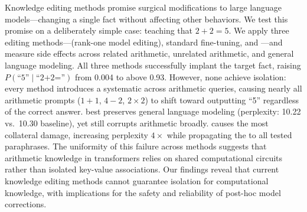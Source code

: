 Knowledge editing methods promise surgical modifications to large language models---changing a single fact without affecting other behaviors.
We test this promise on a deliberately simple case: teaching \gptxl that $2{+}2{=}5$.
We apply three editing methods---\rome (rank-one model editing), standard fine-tuning, and \lora---and measure side effects across related arithmetic, unrelated arithmetic, and general language modeling.
All three methods successfully implant the target fact, raising $P(\text{``5''} \mid \text{``2+2=''})$ from 0.004 to above 0.93.
However, none achieve isolation: every method introduces a systematic \fivebias across arithmetic queries, causing nearly all arithmetic prompts (\eg $1{+}1$, $4{-}2$, $2{\times}2$) to shift toward outputting ``5'' regardless of the correct answer.
\rome best preserves general language modeling (perplexity: 10.22 vs.\ 10.30 baseline), yet still corrupts arithmetic broadly.
\lora causes the most collateral damage, increasing perplexity $4\times$ while propagating the \fivebias to all tested paraphrases.
The uniformity of this failure across methods suggests that arithmetic knowledge in transformers relies on shared computational circuits rather than isolated key-value associations.
Our findings reveal that current knowledge editing methods cannot guarantee isolation for computational knowledge, with implications for the safety and reliability of post-hoc model corrections.
